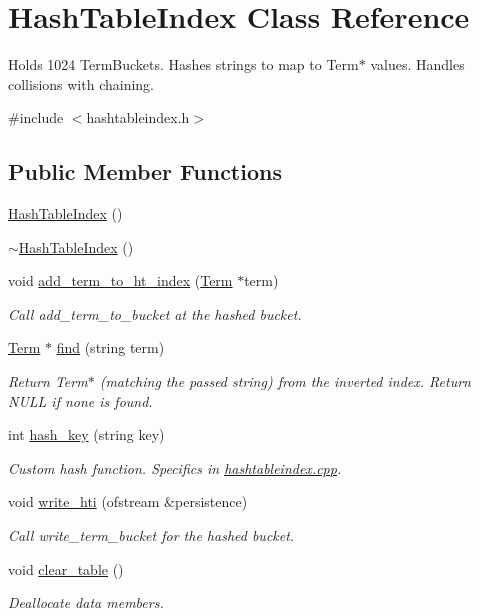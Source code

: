 \hypertarget{class_hash_table_index}{}\section{Hash\+Table\+Index Class Reference}
\label{class_hash_table_index}


Holds 1024 Term\+Buckets. Hashes strings to map to Term$\ast$ values. Handles collisions with chaining.  




{\ttfamily \#include $<$hashtableindex.\+h$>$}

\subsection*{Public Member Functions}
\begin{DoxyCompactItemize}
\item 
\hyperlink{class_hash_table_index_a13c1c8deae84226c8bef382adf103b53}{Hash\+Table\+Index} ()
\item 
\hyperlink{class_hash_table_index_af4d2eeae8263c353f91140cb2583fb58}{$\sim$\+Hash\+Table\+Index} ()
\item 
void \hyperlink{class_hash_table_index_a383ac825c3dde6dd2791bb121da7138d}{add\+\_\+term\+\_\+to\+\_\+ht\+\_\+index} (\hyperlink{class_term}{Term} $\ast$term)
\begin{DoxyCompactList}\small\item\em Call add\+\_\+term\+\_\+to\+\_\+bucket at the hashed bucket. \end{DoxyCompactList}\item 
\hyperlink{class_term}{Term} $\ast$ \hyperlink{class_hash_table_index_a5934917eb943ab770d86ab7ff9142aab}{find} (string term)
\begin{DoxyCompactList}\small\item\em Return Term$\ast$ (matching the passed string) from the inverted index. Return N\+U\+L\+L if none is found. \end{DoxyCompactList}\item 
int \hyperlink{class_hash_table_index_a93a1393996af092def6a7f2b9156f2c6}{hash\+\_\+key} (string key)
\begin{DoxyCompactList}\small\item\em Custom hash function. Specifics in \hyperlink{hashtableindex_8cpp}{hashtableindex.\+cpp}. \end{DoxyCompactList}\item 
void \hyperlink{class_hash_table_index_a8ed7978b35943e4b89526bb5d7017f05}{write\+\_\+hti} (ofstream \&persistence)
\begin{DoxyCompactList}\small\item\em Call write\+\_\+term\+\_\+bucket for the hashed bucket. \end{DoxyCompactList}\item 
void \hyperlink{class_hash_table_index_a253a51a2195d47b3350fdc27fd3d4077}{clear\+\_\+table} ()
\begin{DoxyCompactList}\small\item\em Deallocate data members. \end{DoxyCompactList}\end{DoxyCompactItemize}


